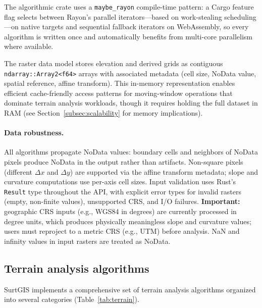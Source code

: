 \documentclass[preprint,review,12pt,authoryear]{elsarticle}
\begin{document}
The algorithmic crate uses a \texttt{maybe\_rayon} compile-time pattern: a Cargo feature flag selects between Rayon's parallel iterators---based on work-stealing scheduling \citep{blumofe1999}---on native targets and sequential fallback iterators on WebAssembly, so every algorithm is written once and automatically benefits from multi-core parallelism where available.

The raster data model stores elevation and derived grids as contiguous \texttt{ndarray::Array2<f64>} arrays with associated metadata (cell size, NoData value, spatial reference, affine transform). This in-memory representation enables efficient cache-friendly access patterns for moving-window operations that dominate terrain analysis workloads, though it requires holding the full dataset in RAM (see Section~\ref{subsec:scalability} for memory implications).

\paragraph{Data robustness.} All algorithms propagate NoData values: boundary cells and neighbors of NoData pixels produce NoData in the output rather than artifacts. Non-square pixels (different $\Delta x$ and $\Delta y$) are supported via the affine transform metadata; slope and curvature computations use per-axis cell sizes. Input validation uses Rust's \texttt{Result} type throughout the API, with explicit error types for invalid rasters (empty, non-finite values), unsupported CRS, and I/O failures. \textbf{Important:} geographic CRS inputs (e.g., WGS84 in degrees) are currently processed in degree units, which produces physically meaningless slope and curvature values; users must reproject to a metric CRS (e.g., UTM) before analysis. NaN and infinity values in input rasters are treated as NoData.

\subsection{Terrain analysis algorithms}
\label{subsec:terrain}

SurtGIS implements a comprehensive set of terrain analysis algorithms organized into several categories (Table~\ref{tab:terrain}).
\end{document}
